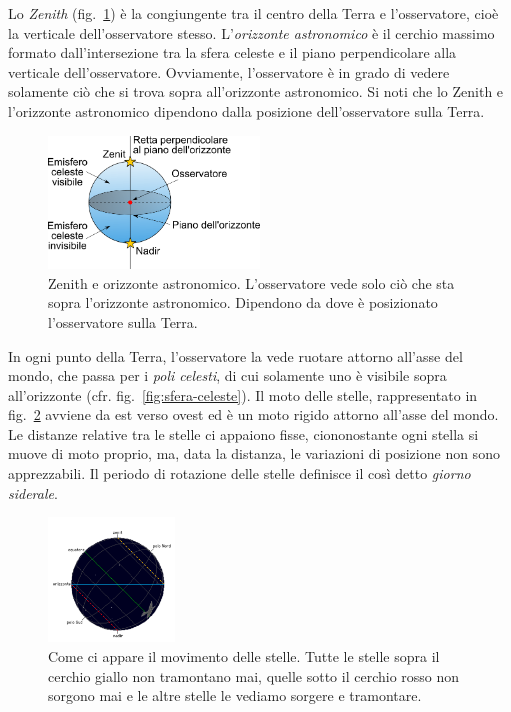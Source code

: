 Lo \emph{Zenith} (fig.~\ref{fig:zenith}) è la congiungente tra il centro della Terra e l'osservatore, cioè la verticale dell'osservatore stesso. L'\emph{orizzonte astronomico} è il cerchio massimo formato dall'intersezione tra la sfera celeste e il piano perpendicolare alla verticale dell'osservatore. Ovviamente, l'osservatore è in grado di vedere solamente ciò che si trova sopra all'orizzonte astronomico. Si noti che lo Zenith e l'orizzonte astronomico dipendono dalla posizione dell'osservatore sulla Terra.

\begin{figure}
\centering
\includegraphics[width=0.5\textwidth]{immagini/zenit.png}
\caption{Zenith e orizzonte astronomico. L'osservatore vede solo ciò che sta sopra l'orizzonte astronomico. Dipendono da dove è posizionato l'osservatore sulla Terra.}
\label{fig:zenith}
\end{figure}

In ogni punto della Terra, l'osservatore la vede ruotare attorno all'asse del mondo, che passa per i \emph{poli celesti}, di cui solamente uno è visibile sopra all'orizzonte (cfr. fig.~\ref{fig:sfera-celeste}). Il moto delle stelle, rappresentato in fig.~\ref{fig:movimento-stelle} avviene da est verso ovest ed è un moto rigido attorno all'asse del mondo. Le distanze relative tra le stelle ci appaiono fisse, ciononostante ogni stella si muove di moto proprio, ma, data la distanza, le variazioni di posizione non sono apprezzabili. Il periodo di rotazione delle stelle definisce il così detto \emph{giorno siderale}.

\begin{figure}
\centering
\includegraphics[width=0.3\textwidth]{immagini/movimento-stelle.png}
\caption{Come ci appare il movimento delle stelle. Tutte le stelle sopra il cerchio giallo non tramontano mai, quelle sotto il cerchio rosso non sorgono mai e le altre stelle le vediamo sorgere e tramontare.}
\label{fig:movimento-stelle}
\end{figure}

